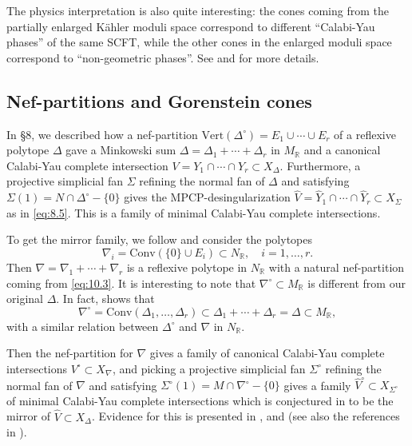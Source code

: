 \documentclass{amsart}
\theoremstyle{plain}
\theoremstyle{definition}
\begin{document}
	The physics interpretation is also quite interesting: the
cones coming from the partially enlarged K\"ahler moduli space
correspond to different ``Calabi-Yau phases'' of the same SCFT, while
the other cones in the enlarged moduli space correspond to
``non-geometric phases''.  See \cite{AGM1} and \cite{MP} for more
details.

	\subsection{Nef-partitions and Gorenstein cones} In
\S8, we described how a nef-partition $\mathrm{Vert}(\Delta^\circ) =
E_1\cup \cdots \cup E_r$ of a reflexive polytope $\Delta$ gave a
Minkowski sum $\Delta = \Delta_1 + \cdots + \Delta_r$ in $M_\mathbb{R}$
and a canonical Calabi-Yau complete intersection $V =
Y_1\cap\cdots\cap Y_r \subset X_\Delta$.  Furthermore, a projective
simplicial fan $\Sigma$ refining the normal fan of $\Delta$ and
satisfying $\Sigma(1) = N\cap\Delta^\circ-\{0\}$ gives the
MPCP-desingularization $\widehat V = \widehat Y_1\cap\cdots\cap
\widehat Y_r \subset X_{\Sigma}$ as in \eqref{eq:8.5}.  This is a family
of minimal Calabi-Yau complete intersections.

	To get the mirror family, we follow \cite{LBor} and consider
the polytopes
\begin{equation}
\nabla_i = \mathrm{Conv}(\{0\}\cup E_i) \subset N_\mathbb{R},\quad i =
1,\dots,r.
\tag{10.3}\label{eq:10.3}
\end{equation}
Then $\nabla = \nabla_1 + \cdots + \nabla_r$ is a reflexive polytope
in $N_\mathbb{R}$ with a natural nef-partition coming from
\eqref{eq:10.3}.  It is interesting to note that $\nabla^\circ \subset
M_\mathbb{R}$ is different from our original $\Delta$.  In fact,
\cite{LBor} shows that
\[
\nabla^\circ = \mathrm{Conv}(\Delta_1,\dots,\Delta_r) \subset \Delta_1
+ \cdots + \Delta_r = \Delta \subset M_\mathbb{R},
\]
with a similar relation between $\Delta^\circ$ and $\nabla$ in
$N_\mathbb{R}$. 

	Then the nef-partition for $\nabla$ gives a family of
canonical Calabi-Yau complete intersections $V^\circ \subset
X_{\nabla}$, and picking a projective simplicial fan $\Sigma^\circ$
refining the normal fan of $\nabla$ and satisfying $\Sigma^\circ(1) =
M\cap\nabla^\circ-\{0\}$ gives a family $\widehat V^\circ \subset
X_{\Sigma^\circ}$ of minimal Calabi-Yau complete intersections which
is conjectured in \cite{LBor} to be the mirror of $\widehat V \subset
X_\Delta$.  Evidence for this is presented in \cite{BB2,BB3},
\cite{Bv} and \cite{LT} (see also the references in \cite{BB3}).
\end{document}
